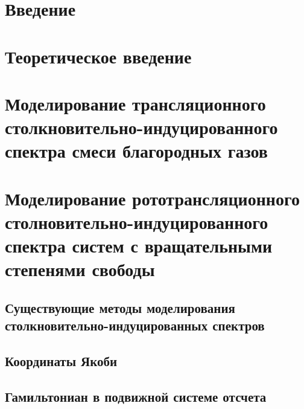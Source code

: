 \documentclass[14pt, a4paper]{extbook}
\begin{document}
\tableofcontents

\chapter{Введение}


\chapter{Теоретическое введение}


\chapter{Моделирование трансляционного столкновительно-индуцированного спектра смеси благородных газов}


\chapter{Моделирование рототрансляционного столновительно-индуцированного спектра систем с вращательными степенями свободы}
\section{Существующие методы моделирования столкновительно-индуцированных спектров}
\section{Координаты Якоби}
\section{Гамильтониан в подвижной системе отсчета}
\end{document}
